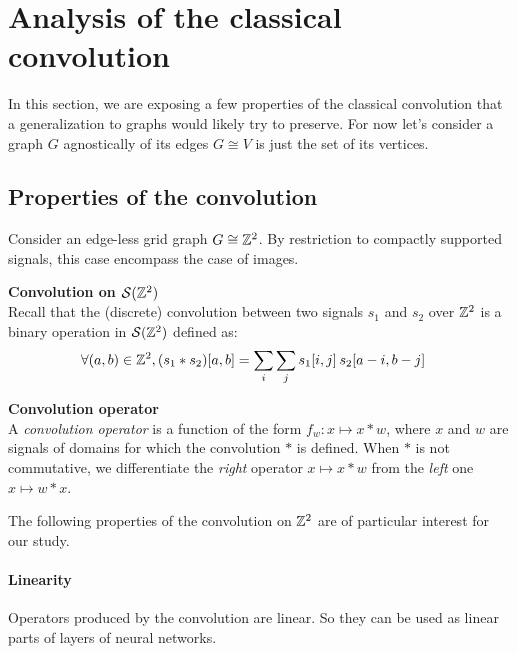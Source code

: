 \section{Analysis of the classical convolution}
\label{sec:2.1}

In this section, we are exposing a few properties of the classical convolution that a generalization to graphs would likely try to preserve. For now let's consider a graph $G$ agnostically of its edges \ie $G \cong V$ is just the set of its vertices.

\subsection{Properties of the convolution}

Consider an edge-less grid graph \ie $G \cong \bbz^2$. By restriction to compactly supported signals, this case encompass the case of images.

\begin{definition}\textbf{Convolution on $\cs(\bbz^2)$}\\
Recall that the (discrete) convolution between two signals $s_1$ and $s_2$ over $\bbz^2$ is a binary operation in $\cs(\bbz^2)$ defined as:
\begin{align*}
\forall (a,b) \in \bbz^2, (s_1 \ast s_2) [a,b] & = \displaystyle \sum_i \sum_j s_1[i,j] \h{2} s_2[a-i, b-j]
\end{align*}
\label{def:conv}
\end{definition}

\begin{definition}\textbf{Convolution operator}\\
A \emph{convolution operator} is a function of the form $f_w: x \mapsto x \ast w$, where $x$ and $w$ are signals of domains for which the convolution $\ast$ is defined. When $\ast$ is not commutative, we differentiate the \emph{right} operator $x \mapsto x \ast w$ from the \emph{left} one $x \mapsto w \ast x$.
\end{definition}

The following properties of the convolution on $\bbz^2$ are of particular interest for our study.

\paragraph{Linearity}
Operators produced by the convolution are linear. So they can be used as linear parts of layers of neural networks.

